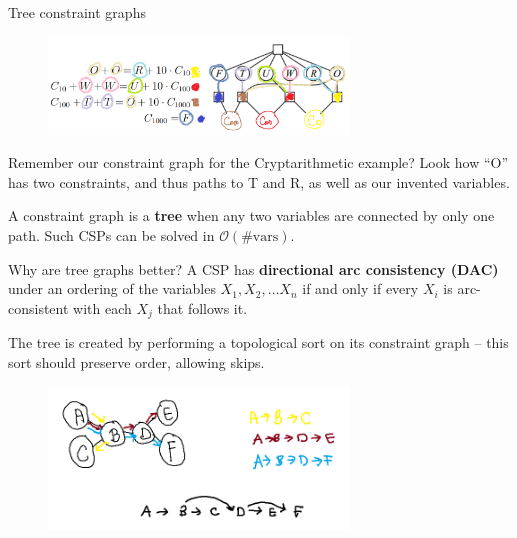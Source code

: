 \documentclass{beamer}
\begin{document}
\begin{frame}{Tree constraint graphs}
    \begin{figure}
        \includegraphics[width=8cm]{images/constraint_hypergraph}
    \end{figure} 

    Remember our constraint graph for the Cryptarithmetic example? Look how ``O'' has two constraints, and thus paths to T and R, as well as our invented variables.

    \vspace{.1in}

    A constraint graph is a {\bf tree} when any two variables are connected by only one path. Such CSPs can be solved in $\mathcal{O}(\text{\# vars})$.
\end{frame}

\begin{frame}{Why are tree graphs better?}
    A CSP has {\bf directional arc consistency (DAC)} under an ordering of the variables 
    $X_1, X_2, \dots X_n$ if and only if every $X_i$ is arc-consistent with each $X_j$ that follows it.

    \vspace{0.1in}
    The tree is created by performing a topological sort on its constraint graph -- this sort should preserve order, allowing skips.

    \begin{figure}
        \includegraphics[width=8cm]{images/top_sort_2}
    \end{figure}
    
\end{frame}
\end{document}
